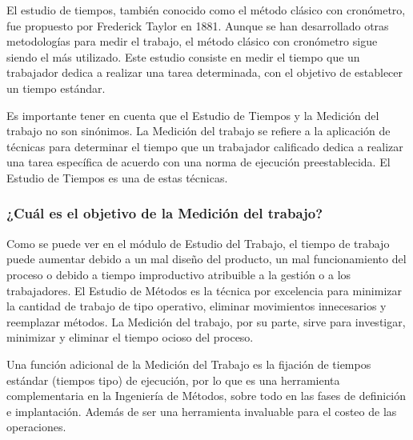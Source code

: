 \documentclass[../main]{subfiles}
\begin{document}
El estudio de tiempos, también conocido como el método clásico con
cronómetro, fue propuesto por Frederick Taylor en 1881. Aunque se han
desarrollado otras metodologías para medir el trabajo, el método
clásico con cronómetro sigue siendo el más utilizado. Este estudio
consiste en medir el tiempo que un trabajador dedica a realizar una
tarea determinada, con el objetivo de establecer un tiempo estándar.

Es importante tener en cuenta que el Estudio de Tiempos y la Medición
del trabajo no son sinónimos. La Medición del trabajo se refiere a la
aplicación de técnicas para determinar el tiempo que un trabajador
calificado dedica a realizar una tarea específica de acuerdo con una
norma de ejecución preestablecida. El Estudio de Tiempos es una de
estas técnicas.


\subsubsection{¿Cuál es el objetivo de la Medición del trabajo?}

Como se puede ver en el módulo de Estudio del Trabajo, el tiempo de
trabajo puede aumentar debido a un mal diseño del producto, un mal
funcionamiento del proceso o debido a tiempo improductivo atribuible
a la gestión o a los trabajadores. El Estudio de Métodos es la
 técnica por excelencia para minimizar la cantidad de trabajo de tipo
operativo, eliminar movimientos innecesarios y reemplazar métodos. La
Medición del trabajo, por su parte, sirve para investigar, minimizar
y eliminar el tiempo ocioso del proceso.

Una función adicional de la Medición del Trabajo es la fijación de
tiempos estándar (tiempos tipo) de ejecución, por lo que es una
herramienta complementaria en la Ingeniería de Métodos, sobre todo en
las fases de definición e implantación. Además de ser una herramienta
invaluable para el costeo de las operaciones.

\end{document}
